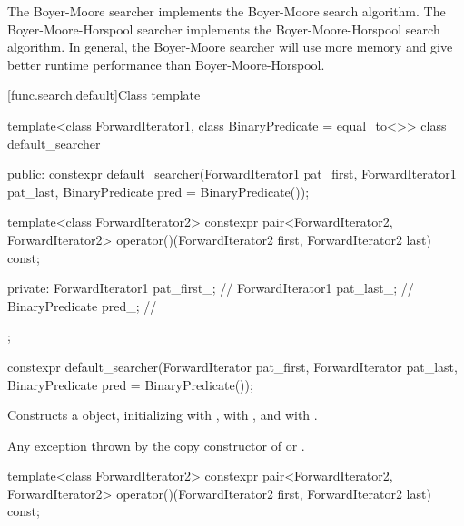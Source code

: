 \pnum
The Boyer-Moore searcher implements the Boyer-Moore search algorithm.
The Boyer-Moore-Horspool searcher implements the Boyer-Moore-Horspool search algorithm.
In general, the Boyer-Moore searcher will use more memory and give better runtime performance than Boyer-Moore-Horspool.

[func.search.default]{Class template }

%
\begin{codeblock}
template<class ForwardIterator1, class BinaryPredicate = equal_to<>>
  class default_searcher {
  public:
    constexpr default_searcher(ForwardIterator1 pat_first, ForwardIterator1 pat_last,
                               BinaryPredicate pred = BinaryPredicate());

    template<class ForwardIterator2>
      constexpr pair<ForwardIterator2, ForwardIterator2>
        operator()(ForwardIterator2 first, ForwardIterator2 last) const;

  private:
    ForwardIterator1 pat_first_;        // \expos
    ForwardIterator1 pat_last_;         // \expos
    BinaryPredicate pred_;              // \expos
  };
\end{codeblock}

%
\begin{itemdecl}
constexpr default_searcher(ForwardIterator pat_first, ForwardIterator pat_last,
                           BinaryPredicate pred = BinaryPredicate());
\end{itemdecl}

\begin{itemdescr}
\pnum
\effects
Constructs a  object, initializing 
with , \mbox{} with , and
 with .

\pnum
\throws
Any exception thrown by the copy constructor of  or
.
\end{itemdescr}

%
\begin{itemdecl}
template<class ForwardIterator2>
  constexpr pair<ForwardIterator2, ForwardIterator2>
    operator()(ForwardIterator2 first, ForwardIterator2 last) const;
\end{itemdecl}

